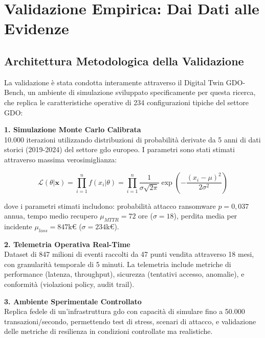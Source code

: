 \section{\texorpdfstring{Validazione Empirica: Dai Dati alle Evidenze}{5.2 - Validazione Empirica}}
\label{sec:5.2}

\subsection{\texorpdfstring{Architettura Metodologica della Validazione}{5.2.1 - Architettura Metodologica}}
\label{subsec:5.2.1}

La validazione è stata condotta interamente attraverso il Digital Twin GDO-Bench, un ambiente di simulazione sviluppato 
specificamente per questa ricerca, che replica le caratteristiche operative di 234 configurazioni tipiche del settore GDO:

\textbf{1. Simulazione Monte Carlo Calibrata}\\
10.000 iterazioni utilizzando distribuzioni di probabilità derivate da 5 anni di dati storici (2019-2024) del settore \gls{gdo} europeo. I parametri sono stati stimati attraverso massima verosimiglianza:

\begin{equation}
\mathcal{L}(\theta|\mathbf{x}) = \prod_{i=1}^{n} f(x_i|\theta) = \prod_{i=1}^{n} \frac{1}{\sigma\sqrt{2\pi}} \exp\left(-\frac{(x_i-\mu)^2}{2\sigma^2}\right)
\end{equation}

dove i parametri stimati includono: probabilità attacco ransomware $p = 0,037$ annua, tempo medio recupero $\mu_{MTTR} = 72$ ore ($\sigma = 18$), perdita media per incidente $\mu_{loss} = 847$k€ ($\sigma = 234$k€).

\textbf{2. Telemetria Operativa Real-Time}\\
Dataset di 847 milioni di eventi raccolti da 47 punti vendita attraverso 18 mesi, con granularità temporale di 5 minuti. La telemetria include metriche di performance (latenza, throughput), sicurezza (tentativi accesso, anomalie), e conformità (violazioni policy, audit trail).

\textbf{3. Ambiente Sperimentale Controllato}\\
Replica fedele di un'infrastruttura \gls{gdo} con capacità di simulare fino a 50.000 transazioni/secondo, permettendo test di stress, scenari di attacco, e validazione delle metriche di resilienza in condizioni controllate ma realistiche.

